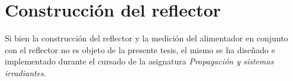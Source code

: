 

\section{Construcción del reflector}
\label{sec_resultados_cons_ref}

Si bien la construcción del reflector y la medición del alimentador en conjunto con el reflector no es objeto de la presente tesis, el mismo se ha diseñado e implementado durante el cursado de la asignatura \emph{Propagación y sistemas irradiantes}.
\begin{figure} [H]
\centering 
{}
\hspace{5mm}
\end{figure}
